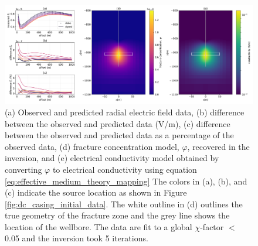 \begin{figure}
    \begin{center}
    \includegraphics[width=\textwidth]{figures/inversion/dc_smooth_inversion_phi_5e-02.png}
    \end{center}
\caption{
    (a) Observed and predicted radial electric field data,
    (b) difference between the observed and predicted data (V/m),
    (c) difference between the observed and predicted data as a percentage of the observed data,
    (d) fracture concentration model, $\varphi$, recovered in the inversion, and
    (e) electrical conductivity model obtained by converting $\varphi$ to electrical conductivity using equation \ref{eq:effective_medium_theory_mapping}
    The colors in (a), (b), and (c) indicate the source location as shown in Figure \ref{fig:dc_casing_initial_data}.
    The white outline in (d) outlines the true geometry of the fracture zone and the grey line shows the location of the wellbore.
    The data are fit to a global $\chi$-factor $<$ 0.05 and the inversion took 5 iterations.
}
\label{fig:dc_smooth_inversion_phi_5e-02}
\end{figure}
